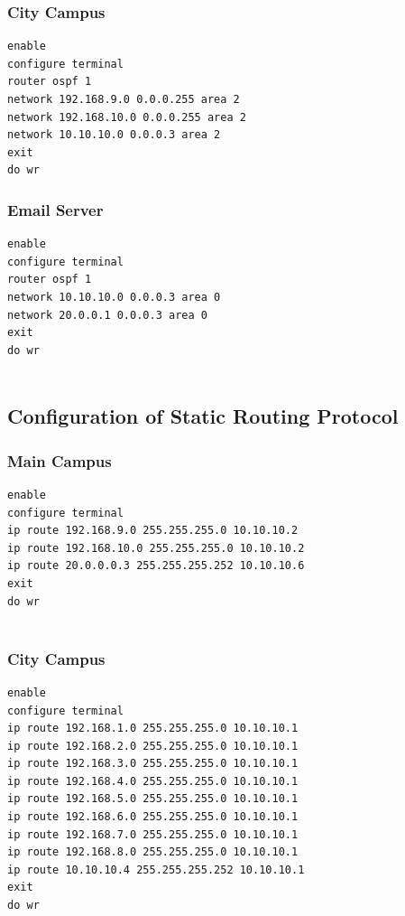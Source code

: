 \documentclass[12pt]{article}
\begin{document}
\subsubsection{City Campus}
\begin{verbatim}
enable
configure terminal
router ospf 1
network 192.168.9.0 0.0.0.255 area 2
network 192.168.10.0 0.0.0.255 area 2
network 10.10.10.0 0.0.0.3 area 2
exit
do wr

\end{verbatim}

\subsubsection{Email Server}
\begin{verbatim}
enable
configure terminal
router ospf 1
network 10.10.10.0 0.0.0.3 area 0
network 20.0.0.1 0.0.0.3 area 0
exit
do wr


\end{verbatim}

\subsection{Configuration of Static Routing Protocol}
\subsubsection{Main Campus}
\begin{verbatim}
enable
configure terminal
ip route 192.168.9.0 255.255.255.0 10.10.10.2
ip route 192.168.10.0 255.255.255.0 10.10.10.2
ip route 20.0.0.0.3 255.255.255.252 10.10.10.6
exit
do wr


\end{verbatim}

\subsubsection{City Campus}
\begin{verbatim}
enable
configure terminal
ip route 192.168.1.0 255.255.255.0 10.10.10.1
ip route 192.168.2.0 255.255.255.0 10.10.10.1
ip route 192.168.3.0 255.255.255.0 10.10.10.1
ip route 192.168.4.0 255.255.255.0 10.10.10.1
ip route 192.168.5.0 255.255.255.0 10.10.10.1
ip route 192.168.6.0 255.255.255.0 10.10.10.1
ip route 192.168.7.0 255.255.255.0 10.10.10.1
ip route 192.168.8.0 255.255.255.0 10.10.10.1
ip route 10.10.10.4 255.255.255.252 10.10.10.1
exit
do wr


\end{verbatim}
\end{document}
